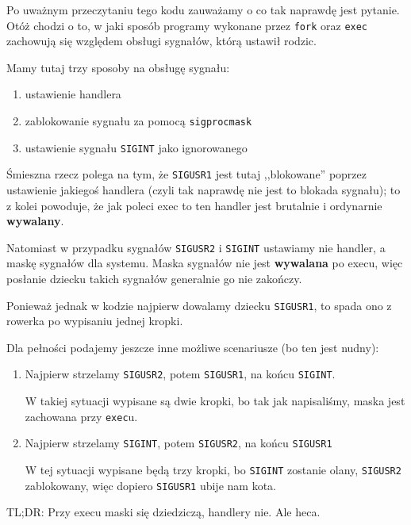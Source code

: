 Po uważnym przeczytaniu tego kodu zauważamy o co tak naprawdę jest pytanie.
Otóż chodzi o to, w jaki sposób programy wykonane przez \texttt{fork} oraz \texttt{exec} zachowują się względem obsługi sygnałów, którą ustawił rodzic.

Mamy tutaj trzy sposoby na obsługę sygnału:
\begin{enumerate}
    \item ustawienie handlera
    \item zablokowanie sygnału za pomocą \texttt{sigprocmask}
    \item ustawienie sygnału \texttt{SIGINT} jako ignorowanego
\end{enumerate}

Śmieszna rzecz polega na tym, że \texttt{SIGUSR1} jest tutaj ,,blokowane'' poprzez ustawienie jakiegoś handlera (czyli tak naprawdę nie jest to blokada sygnału); to z kolei powoduje, że jak poleci exec to ten handler jest brutalnie i ordynarnie \textbf{wywalany}. 

Natomiast w przypadku sygnałów \texttt{SIGUSR2} i \texttt{SIGINT} ustawiamy nie handler, a maskę sygnałów dla systemu. Maska sygnałów nie jest \textbf{wywalana} po execu, więc posłanie dziecku takich sygnałów generalnie go nie zakończy.

Ponieważ jednak w kodzie najpierw dowalamy dziecku \texttt{SIGUSR1}, to spada ono z rowerka po wypisaniu jednej kropki. 

Dla pełności podajemy jeszcze inne możliwe scenariusze (bo ten jest nudny):
\begin{enumerate}
    \item Najpierw strzelamy \texttt{SIGUSR2}, potem \texttt{SIGUSR1}, na końcu \texttt{SIGINT}.
    
    W takiej sytuacji wypisane są dwie kropki, bo tak jak napisaliśmy, maska jest zachowana przy \texttt{exec}u.
    
    \item Najpierw strzelamy \texttt{SIGINT}, potem \texttt{SIGUSR2}, na końcu \texttt{SIGUSR1}
    
    W tej sytuacji wypisane będą trzy kropki, bo \texttt{SIGINT} zostanie olany, \texttt{SIGUSR2} zablokowany, więc dopiero \texttt{SIGUSR1} ubije nam kota.
\end{enumerate}

TL;DR: Przy execu maski się dziedziczą, handlery nie. Ale heca. 